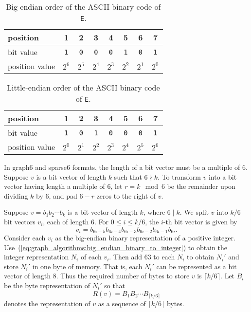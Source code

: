 \begin{table}[!htbp]
\centering
\begin{tabular}{|l|ccccccc|} \hline
position       & 1          & 2          & 3          & 4          & 5          & 6          & 7 \\\hline
bit value      & \texttt{1} & \texttt{0} & \texttt{0} & \texttt{0} & \texttt{1} & \texttt{0} & \texttt{1} \\\hline
position value & $2^6$      & $2^5$      & $2^4$      & $2^3$      & $2^2$      & $2^1$      & $2^0$ \\\hline
\end{tabular}
\caption{Big-endian order of the ASCII binary code of \texttt{E}.}
\label{tab:graph_algorithms:big_endian_ASCII_binary_E}
\end{table}

\begin{table}[!htbp]
\centering
\begin{tabular}{|l|ccccccc|} \hline
position       & 1          & 2          & 3          & 4          & 5          & 6          & 7 \\\hline
bit value      & \texttt{1} & \texttt{0} & \texttt{1} & \texttt{0} & \texttt{0} & \texttt{0} & \texttt{1} \\\hline
position value & $2^0$      & $2^1$      & $2^2$      & $2^3$      & $2^4$      & $2^5$      & $2^6$ \\\hline
\end{tabular}
\caption{Little-endian order of the ASCII binary code of \texttt{E}.}
\label{tab:graph_algorithms:little_endian_ASCII_binary_E}
\end{table}

In graph6 and sparse6 formats, the length of a bit vector must be a
multiple of 6. Suppose $v$ is a bit vector of length $k$ such that
$6 \nmid k$. To transform $v$ into a bit vector having length a
multiple of 6, let $r = k \mod 6$ be the remainder upon dividing $k$
by 6, and pad $6 - r$ zeros to the right of $v$.

Suppose $v = b_1 b_2 \cdots b_k$ is a bit vector of length $k$, where
$6 \;|\; k$. We split $v$ into $k/6$ bit vectors $v_i$, each of length
6. For $0 \leq i \leq k/6$, the $i$-th bit vector is given by
\[
v_i
=
b_{6i-5} b_{6i-4} b_{6i-3} b_{6i-2} b_{6i-1} b_{6i}.
\]
Consider each $v_i$ as the big-endian binary representation of a
positive
integer. Use~(\ref{eq:graph_algorithms:big_endian_binary_to_integer})
to obtain the integer representation $N_i$ of each $v_i$. Then add 63
to each $N_i$ to obtain $N_i'$ and store $N_i'$ in one byte of
memory. That is, each $N_i'$ can be represented as a bit vector of
length $8$. Thus the required number of bytes to store $v$ is
$\lceil k/6 \rceil$. Let $B_i$ be the byte representation of $N_i'$ so
that
%
\begin{equation}
\label{eq:graph_algorithms:byte_representation_bit_vector}
R(v)
=
B_1 B_2 \cdots B_{\lceil k/6 \rceil}
\end{equation}
%
denotes the representation of $v$ as a sequence of $\lceil k/6 \rceil$
bytes.

